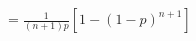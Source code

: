 \documentclass[preview]{standalone}
\begin{document}
\begin{align*}
= \frac{1}{(n+1)p} \left[1 - (1-p)^{n+1}\right]
\end{align*}
\end{document}
